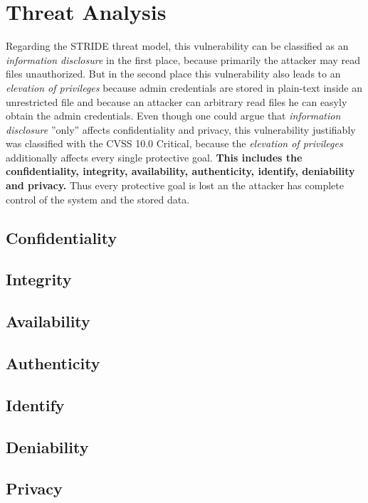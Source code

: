 \section{Threat Analysis}
\label{analysis}
Regarding the STRIDE threat model, this vulnerability can be classified as an \textit{information disclosure} in the first place, because primarily the attacker may read files unauthorized. But in the second place this vulnerability also leads to an \textit{elevation of privileges} \autocite{Schneider-Folie-2} because admin credentials are stored in plain-text inside an unrestricted file and because an attacker can arbitrary read files he can easyly obtain the admin credentials.\autocite{Tenable2:online}
Even though one could argue that \textit{information disclosure} ''only'' affects confidentiality and privacy, this vulnerability justifiably was classified with the CVSS 10.0 Critical, because the \textit{elevation of privileges} additionally affects every single protective goal. \textbf{This includes the confidentiality, integrity, availability, authenticity, identify, deniability and privacy.} Thus every protective goal is lost an the attacker has complete control of the system and the stored data.\autocite{Schneider-Folie-2}

\subsection{Confidentiality}
\subsection{Integrity}
\subsection{Availability}
\subsection{Authenticity}
\subsection{Identify}
\subsection{Deniability}
\subsection{Privacy}



